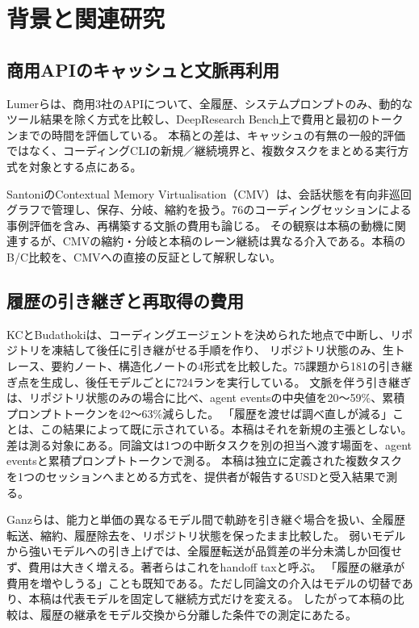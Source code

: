 \documentclass[a4paper,11pt]{article}
\begin{document}
\section{背景と関連研究}\label{sec:related}
\subsection{商用APIのキャッシュと文脈再利用}
Lumerら\cite{dontbreakcache}は、商用3社のAPIについて、全履歴、システムプロンプトのみ、動的なツール結果を除く方式を比較し、DeepResearch Bench上で費用と最初のトークンまでの時間を評価している。
本稿との差は、キャッシュの有無の一般的評価ではなく、コーディングCLIの新規／継続境界と、複数タスクをまとめる実行方式を対象とする点にある。

SantoniのContextual Memory Virtualisation（CMV）\cite{cmv}は、会話状態を有向非巡回グラフで管理し、保存、分岐、縮約を扱う。76のコーディングセッションによる事例評価を含み、再構築する文脈の費用も論じる。
その観察は本稿の動機に関連するが、CMVの縮約・分岐と本稿のレーン継続は異なる介入である。本稿のB/C比較を、CMVへの直接の反証として解釈しない。

\subsection{履歴の引き継ぎと再取得の費用}
KCとBudathoki\cite{handoffdebt}は、コーディングエージェントを決められた地点で中断し、リポジトリを凍結して後任に引き継がせる手順を作り、
リポジトリ状態のみ、生トレース、要約ノート、構造化ノートの4形式を比較した。75課題から181の引き継ぎ点を生成し、後任モデルごとに724ランを実行している。
文脈を伴う引き継ぎは、リポジトリ状態のみの場合に比べ、agent eventsの中央値を20〜59\%、累積プロンプトトークンを42〜63\%減らした。
「履歴を渡せば調べ直しが減る」ことは、この結果によって既に示されている。本稿はそれを新規の主張としない。
差は測る対象にある。同論文は1つの中断タスクを別の担当へ渡す場面を、agent eventsと累積プロンプトトークンで測る。
本稿は独立に定義された複数タスクを1つのセッションへまとめる方式を、提供者が報告するUSDと受入結果で測る。

Ganzら\cite{handofftax}は、能力と単価の異なるモデル間で軌跡を引き継ぐ場合を扱い、全履歴転送、縮約、履歴除去を、リポジトリ状態を保ったまま比較した。
弱いモデルから強いモデルへの引き上げでは、全履歴転送が品質差の半分未満しか回復せず、費用は大きく増える。著者らはこれをhandoff taxと呼ぶ。
「履歴の継承が費用を増やしうる」ことも既知である。ただし同論文の介入はモデルの切替であり、本稿は代表モデルを固定して継続方式だけを変える。
したがって本稿の比較は、履歴の継承をモデル交換から分離した条件での測定にあたる。
\end{document}

